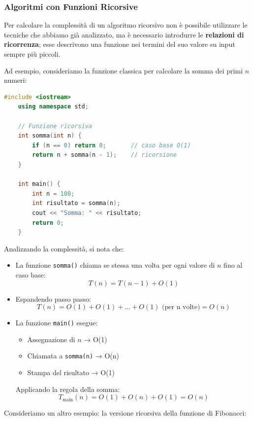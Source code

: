 \subsubsection{Algoritmi con Funzioni Ricorsive} 	

Per calcolare la complessità di un algoritmo ricorsivo non è possibile utilizzare le tecniche che abbiamo già analizzato, ma è necessario introdurre le \textbf{relazioni di ricorrenza}; esse descrivono una funzione nei termini del suo valore su input sempre più piccoli.




Ad esempio, consideriamo la funzione classica per calcolare la somma dei primi $n$ numeri:

\begin{lstlisting}[language=C++]
	#include <iostream>
	using namespace std;
	
	// Funzione ricorsiva
	int somma(int n) {
		if (n == 0) return 0;       // caso base O(1)
		return n + somma(n - 1);    // ricorsione
	}
	
	int main() {
		int n = 100;
		int risultato = somma(n);
		cout << "Somma: " << risultato;
		return 0;
	}
\end{lstlisting}

Analizzando la complessità, si nota che: 

\begin{itemize}
	\item La funzione \texttt{somma()} chiama se stessa una volta per ogni valore di $n$ fino al caso base:
	\[
	T(n) = T(n-1) + O(1)
	\]
	
	\item Espandendo passo passo:
	\[
	T(n) = O(1) + O(1) + \dots + O(1) \text{ (per n volte)} = O(n)
	\]
	
	\item La funzione \texttt{main()} esegue:
	\begin{itemize}
		\item Assegnazione di $n$ → O(1)
		\item Chiamata a \texttt{somma(n)} → O(n)
		\item Stampa del risultato → O(1)
	\end{itemize}
	
	Applicando la regola della somma:
	\[
	T_{\text{main}}(n) = O(1) + O(n) + O(1) = O(n)
	\]
\end{itemize}


\vspace{1cm}

Consideriamo un altro esempio: la versione ricorsiva della funzione di Fibonacci:


